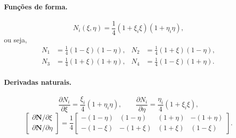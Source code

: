 \documentclass[11pt,a4paper]{article}
\begin{document}
\paragraph{Funções de forma.}
\begin{equation*}
\boxed{N_i(\xi,\eta)=\frac14(1+\xi_i\xi)(1+\eta_i\eta),}
\end{equation*}
ou seja,
\begin{align*}
N_1&=\tfrac14(1-\xi)(1-\eta), & N_2&=\tfrac14(1+\xi)(1-\eta),\\
N_3&=\tfrac14(1+\xi)(1+\eta), & N_4&=\tfrac14(1-\xi)(1+\eta).
\end{align*}

\paragraph{Derivadas naturais.}
\begin{equation*}
\frac{\partial N_i}{\partial\xi}=\frac{\xi_i}{4}(1+\eta_i\eta),\qquad
\frac{\partial N_i}{\partial\eta}=\frac{\eta_i}{4}(1+\xi_i\xi),
\end{equation*}
\begin{equation*}
\begin{bmatrix}\partial\mathbf N/\partial\xi\\ \partial\mathbf N/\partial\eta\end{bmatrix}
=\frac14\begin{bmatrix}
-(1-\eta)&(1-\eta)&(1+\eta)&-(1+\eta)\\
-(1-\xi)&-(1+\xi)&(1+\xi)&(1-\xi)
\end{bmatrix}.
\end{equation*}
\end{document}

